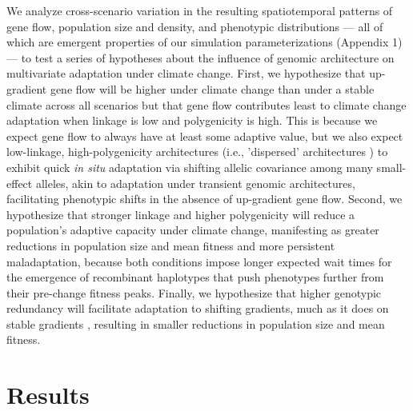\documentclass[9pt,twocolumn,twoside,lineno]{pnas-new}
\begin{document}
We analyze cross-scenario variation in the resulting spatiotemporal
patterns of gene flow, population size and density, and phenotypic
distributions --- all of which are emergent properties of our simulation
parameterizations (Appendix 1) --- 
to test a series of hypotheses about the influence of genomic architecture 
on multivariate adaptation under climate change. First, we hypothesize that up-gradient 
gene flow will be higher under climate change than under a stable climate across all
scenarios but that gene flow contributes least to climate change adaptation when
linkage is low and polygenicity is high.
This is because we expect gene flow to always have
at least some adaptive value, but we also expect low-linkage, high-polygenicity architectures 
(i.e., 'dispersed' architectures \cite{yeaman_review}) to exhibit quick \textit{in situ}
adaptation via shifting allelic covariance among many small-effect alleles, akin to adaptation 
under transient genomic architectures, facilitating phenotypic shifts in the absence of up-gradient gene flow.
Second, we hypothesize that stronger linkage 
and higher polygenicity will reduce a population's adaptive capacity under climate change,
manifesting as greater reductions in population size and mean fitness
and more persistent maladaptation, because both conditions impose longer expected
wait times for the emergence of recombinant haplotypes that push phenotypes
further from their pre-change fitness peaks. Finally, we hypothesize that higher genotypic redundancy
will facilitate adaptation to shifting gradients, much as it does on stable gradients 
\cite{barghi_redundancy,manceau,yeaman_amnat}, resulting in smaller reductions 
in population size and mean fitness.


\section*{Results}
\end{document}
